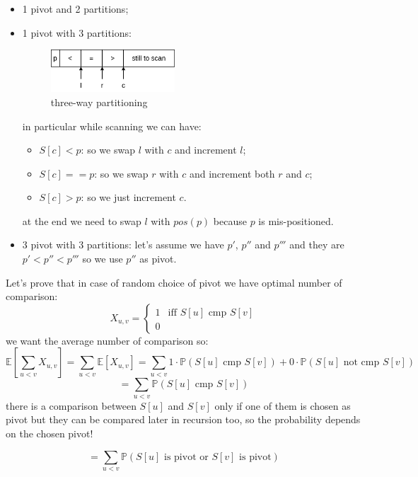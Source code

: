 \begin{itemize}
    \item 1 pivot and 2 partitions;
    \item 1 pivot with 3 partitions:
    \begin{figure}[H]
        \centering
        \includegraphics[width=175px]{images/2_Sorting/three-way-partitioning.png}
        \caption{three-way partitioning}
    \end{figure}
    in particular while scanning we can have:
    \begin{itemize}
        \item $S[c] < p$: so we swap $l$ with $c$ and increment $l$;
        \item $S[c] == p$: so we swap $r$ with $c$ and increment both $r$ and $c$;
        \item $S[c] > p$: so we just increment $c$.
    \end{itemize}
    at the end we need to swap $l$ with $pos(p)$ because $p$ is mis-positioned.
    
    \item 3 pivot with 3 partitions: let's assume we have $p'$, $p''$ and $p'''$ and they are $p' < p'' < p'''$ so we use $p''$ as pivot.
\end{itemize}

Let's prove that in case of random choice of pivot we have optimal number of comparison:
$$
    X_{u,v} = 
    \begin{cases}
        1 & \text{iff $S[u]$ cmp $S[v]$} \\
        0
    \end{cases}
$$
we want the average number of comparison so:
$$
    \mathbb{E} \left[ \sum_{u < v} X_{u,v} \right] =  \sum_{u < v} \mathbb{E} \left[ X_{u,v} \right] = \sum_{u < v} 1 \cdot \mathbb{P} \left( S[u] \text{ cmp } S[v] \right) + 0 \cdot \mathbb{P} \left( S[u] \text{ not cmp } S[v] \right)
$$
$$
    = \sum_{u < v} \mathbb{P} \left( S[u] \text{ cmp } S[v] \right)
$$
there is a comparison between $S[u]$ and $S[v]$ only if one of them is chosen as pivot but they can be compared later in recursion too, so the probability depends on the chosen pivot!

$$
    = \sum_{u < v} \mathbb{P} \left( S[u] \text{ is pivot or } S[v] \text{ is pivot} \right)
$$

